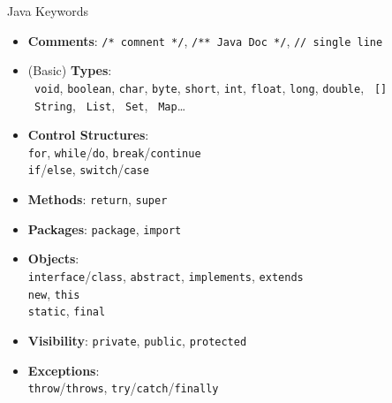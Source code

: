 \documentclass[English,c,%
hyperref={%
    pdftitle={FISA-DE2 OOP in Java},%
    pdfauthor={Muller, Gravier, Laforest, Subercaze},%
    pdfsubject={OOP in Java},%
    pdfkeywords={OOP, Java},%
    colorlinks=true,%
    urlcolor=blue,%
    linkcolor=%
    },%
xcolor={pdftex,svgnames} %
]{beamer}
\begin{document}
\begin{frame}{Java Keywords}

  { \footnotesize
  \begin{itemize}

    \item \textbf{Comments}: \texttt{/* comnent */}, \texttt{/** Java Doc */}, \texttt{// single line} \\

    \item (Basic) \textbf{Types}: \\
    \texttt{\color{red} void}, \texttt{boolean}, \texttt{char}, \texttt{byte},
    \texttt{short}, \texttt{int}, \texttt{float}, \texttt{long},
    \texttt{double}, \texttt{\color{red} []}\\
    \texttt{\color{red} String}, \texttt{\color{red} List}, \texttt{\color{red} Set}, \texttt{\color{red} Map}\ldots{}

    \item \textbf{Control Structures}: \\
    \texttt{for}, \texttt{while}/\texttt{do},
    \texttt{break}/\texttt{continue}\\
    \texttt{if}/\texttt{else}, \texttt{switch}/\texttt{case}

    \item \textbf{Methods}: \texttt{return}, \texttt{super}

    \item \textbf{Packages}: \texttt{package}, \texttt{import}

    \item \textbf{Objects}:\\
    \texttt{interface}/\texttt{class}, \texttt{abstract},
    \texttt{implements}, \texttt{extends}\\
    \texttt{new}, \texttt{this}\\
    \texttt{static}, \texttt{final}

    \item \textbf{Visibility}: \texttt{private}, \texttt{public}, \texttt{protected}

    \item \textbf{Exceptions}:\\
    \texttt{throw}/\texttt{throws}, \texttt{try}/\texttt{catch}/\texttt{finally}

  \end{itemize}
}

\end{frame}
\end{document}
